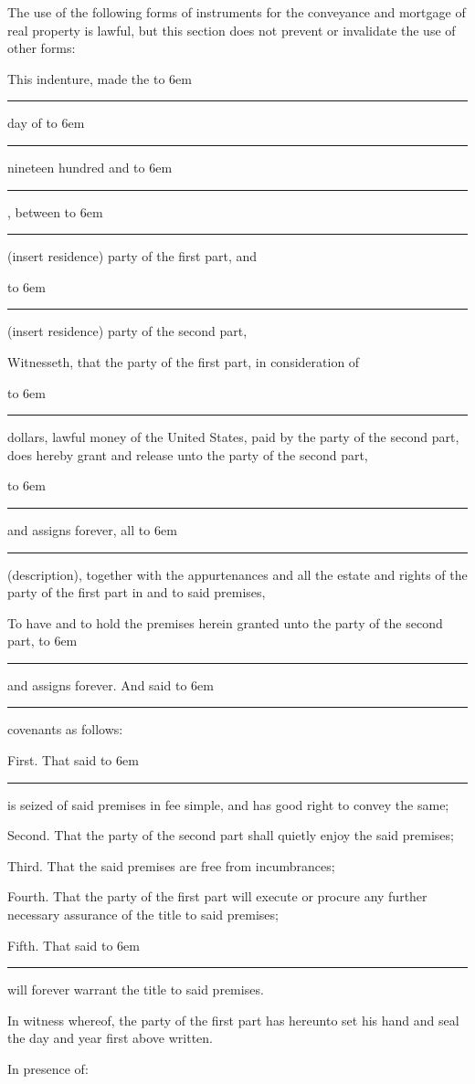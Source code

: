 

The use of the following forms of instruments for the conveyance and mortgage of
real property is lawful, but this section does not prevent or invalidate the
use of other forms: 



\def\blankunderline{
    \unskip\space\hbox to 6em{\leaders\hrule\hfill}\space\ignorespaces
}


This indenture, made the \blankunderline day of \blankunderline nineteen hundred  and \blankunderline,
between \blankunderline (insert residence) party of the first part, and
\blankunderline (insert residence) party of the second part, 

Witnesseth, that the party of the first part, in consideration of
\blankunderline
dollars, lawful money of the United States, paid by the party of the second
part, does hereby grant and release unto the party of the second part,
\blankunderline and assigns forever, all \blankunderline (description), together
with the
appurtenances and all the estate and rights of the party of the first part in
and to said premises, 

To have and to hold the premises herein granted unto the party of the second
part, \blankunderline and assigns forever. And said \blankunderline covenants as
follows: 

First. That said \blankunderline is seized of said premises in fee simple, and
has good right to convey the same; 

Second. That the party of the second part shall quietly enjoy the said premises;


Third. That the said premises are free from incumbrances; 

Fourth. That the party of the first part will execute or procure any further
necessary assurance of the title to said premises; 

Fifth. That said \blankunderline will forever warrant the title to said
premises. 

In witness whereof, the party of the first part has hereunto set his hand and
seal the day and year first above written. 

In presence of:


